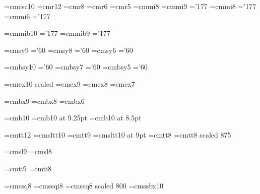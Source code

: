 \font\tensc=cmcsc10 %
\font\twelverm=cmr12
\font\eightrm=cmr8
\font\sixrm=cmr6 \font\fiverm=cmr5
\font\eighti=cmmi8
\font\ninei=cmmi9  \skewchar\ninei='177
\font\eighti=cmmi8  \skewchar\eighti='177
\font\sixi=cmmi6  \skewchar\sixi='177

\font\tenbi=cmmib10  \skewchar\tenbi='177
\font\ninebi=cmmib9  \skewchar\ninebi='177

\font\ninesy=cmsy9  \skewchar\ninesy='60
\font\eightsy=cmsy8  \skewchar\eightsy='60
\font\sixsy=cmsy6  \skewchar\sixsy='60

\font\tenbsy=cmbsy10  \skewchar\tenbsy='60
\font\sevenbsy=cmbsy7  \skewchar\sevenbsy='60
\font\fivebsy=cmbsy5  \skewchar\fivebsy='60

\font\elevenex=cmex10 scaled\magstephalf
\font\nineex=cmex9
\font\eightex=cmex8
\font\sevenex=cmex7

\font\ninebf=cmbx9
\font\eightbf=cmbx8
\font\sixbf=cmbx6

\font\tenthinbf=cmb10
\font\ninethinbf=cmb10 at 9.25pt
\font\eightthinbf=cmb10 at 8.5pt

\font\twelvett=cmtt12  \hyphenchar{}  %
\font\tensltt=cmsltt10  \hyphenchar{}
\font\ninett=cmtt9  \hyphenchar{}
\font\ninesltt=cmsltt10 at 9pt  \hyphenchar{}
\font\eighttt=cmtt8  \hyphenchar{}
\font\seventt=cmtt8 scaled 875  \hyphenchar{}

\font\ninesl=cmsl9
\font\eightsl=cmsl8

\font\nineit=cmti9
\font\eightit=cmti8

\font\eightss=cmssq8
\font\eightssi=cmssqi8
\font\sixss=cmssq8 scaled 800
\font\tenssbx=cmssbx10

\def\footnotesize{\def\rm{\fam0\eightrm}%
  \textfont0=\eightrm \scriptfont0=\sixrm \scriptscriptfont0=\fiverm
  \textfont1=\eighti \scriptfont1=\sixi \scriptscriptfont1=\fivei
  \textfont2=\eightsy \scriptfont2=\sixsy \scriptscriptfont2=\fivesy
  \textfont3=\eightex \scriptfont3=\sevenex \scriptscriptfont3=\sevenex
  \def\it{\fam\itfam\eightit}%
  \textfont\itfam=\eightit
  \def\sl{\fam\slfam\eightsl}%
  \textfont\slfam=\eightsl
  \def\bf{\fam\bffam\eightbf}%
  \textfont\bffam=\eightbf \scriptfont\bffam=\sixbf
   \scriptscriptfont\bffam=\fivebf
  \def\tt{\fam\ttfam\eighttt}%
  \let\sltt=\error
  \textfont\ttfam=\eighttt
  \def\oldstyle{\fam\@ne\eighti}%
  \normalbaselineskip=9pt
  \def\bigfences{\textfont3=\nineex}%
  \let\big=\eightbig
  \let\Big=\eightBig
  \let\bigg=\eightbigg
  \let\Bigg=\eightBigg
  \setbox\strutbox=\hbox{\vrule height7pt depth2pt width\z@}%
  \setbox0=\hbox{$\partial$}%
  \let\adbcfont=\sixrm
  \let\mc=\sevenrm %
  \let\boldit=\error
  \let\ii=\eightii
  \def\MF{{\manfnt opqr}\-{\manfnt stuq}}%
  \normalbaselines\rm}



